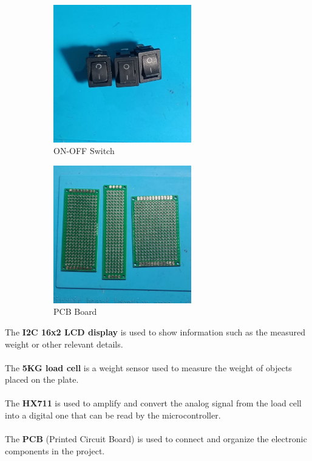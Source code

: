 \begin{figure}[H]
\begin{subfigure}{0.5\textwidth}
\includegraphics[width=0.9\linewidth, height=6cm]{medias/parts/on_off_switch.jpg} 
\caption{ON-OFF Switch}
\label{fig:switch}
\end{subfigure}
\begin{subfigure}{0.5\textwidth}
\includegraphics[width=0.9\linewidth, height=6cm]{medias/parts/pcb_board.jpg}
\caption{PCB Board}
\label{fig:pcb}
\end{subfigure}
\caption{}
\end{figure}

\noindent
The \textbf{I2C 16x2 LCD display} is used to show information such as the measured weight or other relevant details. \\
\\
The \textbf{5KG load cell} is a weight sensor used to measure the weight of objects placed on the plate.\\
\\
The \textbf{HX711} is used to amplify and convert the analog signal from the load cell into a digital one that can be read by the microcontroller.\\
\\
The \textbf{PCB} (Printed Circuit Board) is used to connect and organize the electronic components in the project.\\



